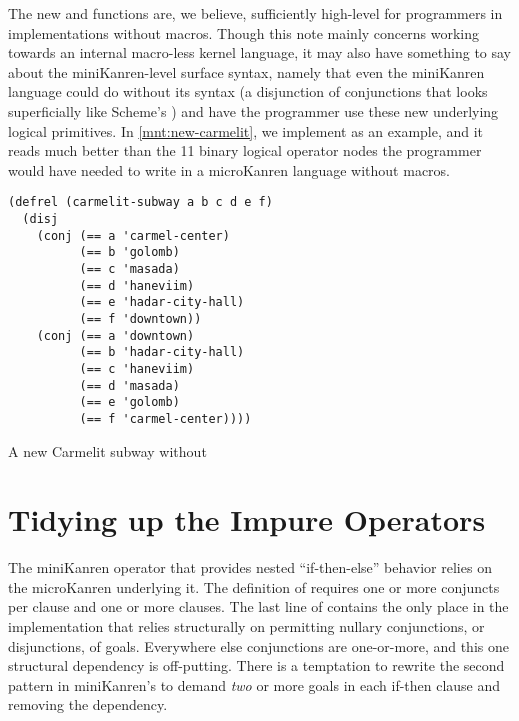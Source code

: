 \documentclass[sigplan,balance,pbalance,natbib=false]{acmart}
\begin{document}
The new  and  functions are, we
believe, sufficiently high-level for programmers in implementations
without macros. Though this note mainly concerns working towards an
internal macro-less kernel language, it may also have something to say
about the miniKanren-level surface syntax, namely that even the
miniKanren language could do without its  syntax (a
disjunction of conjunctions that looks superficially like
Scheme's ) and have the programmer use these new
underlying logical primitives. In \cref{mnt:new-carmelit}, we
implement  as an example, and it reads
much better than the 11 binary logical operator nodes the programmer
would have needed to write in a microKanren language without macros.

\begin{listing}[h]
  \begin{verbatim}
(defrel (carmelit-subway a b c d e f)
  (disj
    (conj (== a 'carmel-center)
          (== b 'golomb)
          (== c 'masada)
          (== d 'haneviim)
          (== e 'hadar-city-hall)
          (== f 'downtown))
    (conj (== a 'downtown)
          (== b 'hadar-city-hall)
          (== c 'haneviim)
          (== d 'masada)
          (== e 'golomb)
          (== f 'carmel-center))))
  \end{verbatim}
  \caption{A new Carmelit subway without }\label{mnt:new-carmelit}
\end{listing}

\section{Tidying up the Impure Operators}\label{sec:impure}

The miniKanren  operator that provides nested
\enquote{if-then-else} behavior relies on the
microKanren  underlying it. The definition
of  requires one or more conjuncts per clause and
one or more clauses. The last line of  contains the
only place in the implementation that relies structurally on
permitting nullary conjunctions, or disjunctions, of goals. Everywhere
else conjunctions are one-or-more, and this one structural dependency
is off-putting. There is a temptation to rewrite the second pattern in
miniKanren's  to demand \emph{two} or more goals in
each if-then clause and removing the dependency.
\end{document}
